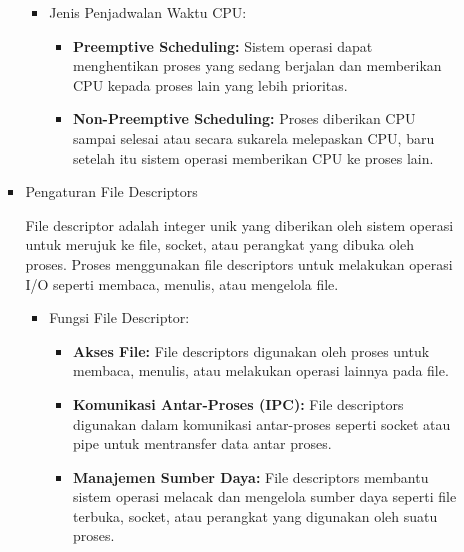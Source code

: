 \documentclass[12pt]{article}
\begin{document}
\begin{itemize}
\begin{itemize}
\begin{itemize}
        \begin{itemize}
            \item Jenis Penjadwalan Waktu CPU:
                \begin{itemize}
                    \item \textbf{Preemptive Scheduling:} Sistem operasi dapat menghentikan proses yang sedang berjalan dan memberikan CPU kepada proses lain yang lebih prioritas.
                    \item \textbf{Non-Preemptive Scheduling:} Proses diberikan CPU sampai selesai atau secara sukarela melepaskan CPU, baru setelah itu sistem operasi memberikan CPU ke proses lain.
                \end{itemize}
        \end{itemize}
        
        \item Pengaturan File Descriptors
        
        File descriptor adalah integer unik yang diberikan oleh sistem operasi untuk merujuk ke file, socket, atau perangkat yang dibuka oleh proses. Proses menggunakan file descriptors untuk melakukan operasi I/O seperti membaca, menulis, atau mengelola file.
        
        \begin{itemize}
            \item Fungsi File Descriptor:
                \begin{itemize}
                    \item \textbf{Akses File:} File descriptors digunakan oleh proses untuk membaca, menulis, atau melakukan operasi lainnya pada file.
                    \item \textbf{Komunikasi Antar-Proses (IPC):} File descriptors digunakan dalam komunikasi antar-proses seperti socket atau pipe untuk mentransfer data antar proses.
                    \item \textbf{Manajemen Sumber Daya:} File descriptors membantu sistem operasi melacak dan mengelola sumber daya seperti file terbuka, socket, atau perangkat yang digunakan oleh suatu proses.
                \end{itemize}
        \end{itemize}
        
    \end{itemize}


\end{itemize}
\end{itemize}
\end{document}
